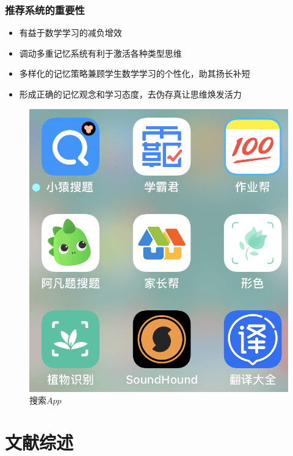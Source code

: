 \documentclass[serif]{beamer}
\begin{document}
  \begin{frame}\frametitle{推荐系统的重要性}
  	 \begin{itemize}
  	 	\item 有益于数学学习的减负增效
  	 	\item 调动多重记忆系统有利于激活各种类型思维
  	 	\item 多样化的记忆策略兼顾学生数学学习的个性化，助其扬长补短
  	 	\item 形成正确的记忆观念和学习态度，去伪存真让思维焕发活力
  	 \end{itemize}
   \pause
     \begin{figure}
     	\centering
     	\includegraphics[scale=0.16]{search.png}
     	\caption{搜索$ App $}
     \end{figure}
     
  \end{frame} 

  \section{文献综述}
\end{document}
